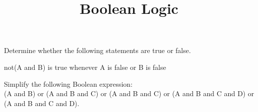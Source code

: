 \documentclass{ximera}
\title{Boolean Logic}
\begin{document}
\maketitle


\begin{question}
Determine whether the following statements are true or false.

\begin{question}
not(A and B) is true whenever A is false or B is false
\begin{multiple-choice}
\end{multiple-choice}
\end{question}

\begin{question}
\begin{multiple-choice}
\end{multiple-choice}
\end{question}

\begin{question}
\begin{multiple-choice}
\end{multiple-choice}
\end{question}

\begin{question}
\begin{multiple-choice}
\end{multiple-choice}
\end{question}

\end{question}

\begin{question}
Simplify the following Boolean expression: \\
(A and B) or (A and B and C) or (A and B and C) or (A and B and C and D) or (A and B and C and D).
\begin{solution}
\begin{multiple-choice}
\end{multiple-choice}
\end{solution}
\end{question}
\end{document}
